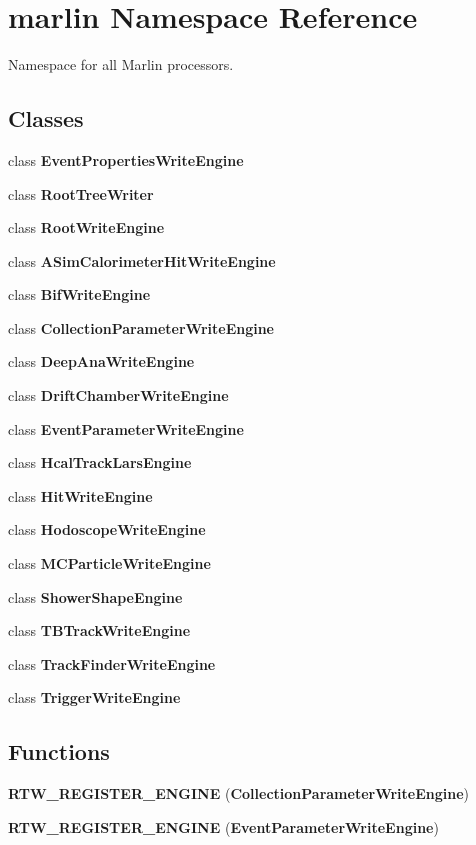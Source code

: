 \section{marlin Namespace Reference}
\label{namespacemarlin}


Namespace for all Marlin processors.  
\subsection*{Classes}
\begin{DoxyCompactItemize}
\item 
class {\bf EventPropertiesWriteEngine}
\item 
class {\bf RootTreeWriter}
\item 
class {\bf RootWriteEngine}
\item 
class {\bf ASimCalorimeterHitWriteEngine}
\item 
class {\bf BifWriteEngine}
\item 
class {\bf CollectionParameterWriteEngine}
\item 
class {\bf DeepAnaWriteEngine}
\item 
class {\bf DriftChamberWriteEngine}
\item 
class {\bf EventParameterWriteEngine}
\item 
class {\bf HcalTrackLarsEngine}
\item 
class {\bf HitWriteEngine}
\item 
class {\bf HodoscopeWriteEngine}
\item 
class {\bf MCParticleWriteEngine}
\item 
class {\bf ShowerShapeEngine}
\item 
class {\bf TBTrackWriteEngine}
\item 
class {\bf TrackFinderWriteEngine}
\item 
class {\bf TriggerWriteEngine}
\end{DoxyCompactItemize}
\subsection*{Functions}
\begin{DoxyCompactItemize}
\item 
{\bfseries RTW\_\-REGISTER\_\-ENGINE} ({\bf CollectionParameterWriteEngine})\label{namespacemarlin_a14315d6fe618896a72ced2114cd7bedd}

\item 
{\bfseries RTW\_\-REGISTER\_\-ENGINE} ({\bf EventParameterWriteEngine})\label{namespacemarlin_a7c82289cb953414fdfde7267cf6b07e7}

\end{DoxyCompactItemize}
